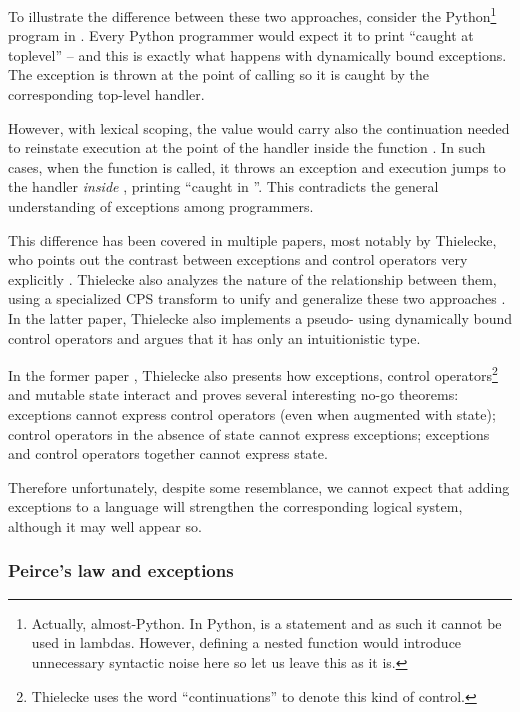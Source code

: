 To illustrate the difference between these two approaches, consider the
Python\footnote{Actually, almost-Python. In Python,
 is a statement and as such it cannot be used in lambdas. However, defining
a nested function would introduce unnecessary syntactic noise here so let us leave this as it is.}
program in . Every Python programmer would expect it to print
``caught at toplevel'' -- and this is exactly what happens with dynamically bound exceptions.
The exception is thrown at the point of calling  so it is caught by the corresponding
top-level handler.

However, with lexical scoping, the value  would carry also the continuation needed
to reinstate execution at the point of the handler inside the function . In such cases,
when the function  is called, it throws an exception and execution jumps to the handler
\emph{inside }, printing ``caught in ''. This contradicts the general
understanding of exceptions among programmers.

This difference has been covered in multiple papers, most notably by Thielecke, who
points out the contrast between exceptions and control operators very explicitly
\cite{thielecke:contrast}. Thielecke also analyzes the nature of the relationship between
them, using a specialized CPS transform to unify and generalize these two approaches
\cite{thielecke01}. In the latter paper, Thielecke also implements a pseudo-
using dynamically bound control operators and argues that it has only an intuitionistic type.

In the former paper \cite{thielecke:contrast}, Thielecke also presents how exceptions,
control operators\footnote{Thielecke uses the word ``continuations'' to denote this kind
of control.} and mutable state interact and proves several interesting no-go theorems:
exceptions cannot express control operators (even when augmented with state); control
operators in the absence of state cannot express exceptions; exceptions and control operators
together cannot express state.

Therefore unfortunately, despite some resemblance, we cannot expect that adding exceptions
to a language will strengthen the corresponding logical system, although it may well appear so.

\subsubsection{Peirce's law and exceptions}

